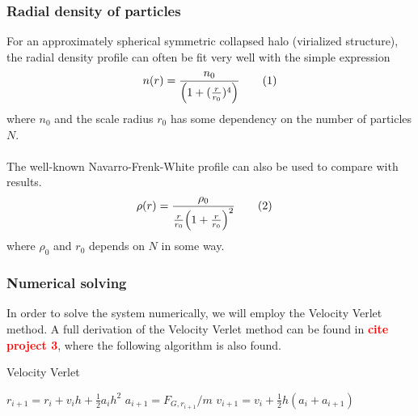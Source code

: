 \documentclass{article}
\newcommand\red[1]{\textcolor{red}{\textbf{#1}}}
\newcommand\numberthis{\addtocounter{equation}{1}\tag{\theequation}}
\begin{document}
\subsubsection{Radial density of particles}
For an approximately spherical symmetric collapsed halo (virialized structure), the radial density profile can often be fit very well with the simple expression
\begin{align*}
  n(r) = \frac{n_0}{\Big(1+(\frac{r}{r_0})^4\Big)} \numberthis\label{eq:radial_dist}
\end{align*}
where $n_0$ and the scale radius $r_0$ has some dependency on the number of particles $N$.\\\\
The well-known Navarro-Frenk-White profile can also be used to compare with results.
\begin{align*}
  \rho(r) &= \frac{\rho_0}{\frac{r}{r_0}\Big(1+\frac{r}{r_0}\Big)^2}\numberthis\label{eq:NFW}
\end{align*}
where $\rho_0$ and $r_0$ depends on $N$ in some way.
\subsubsection{Numerical solving}
In order to solve the system numerically, we will employ the Velocity Verlet method. A full derivation of the Velocity Verlet method can be found in \red{cite project 3}, where the following algorithm is also found.
\begin{algorithm}[H]
\small
\caption{Velocity Verlet}\label{alg:VelVerlet}
\begin{algorithmic}[1]
\State $r_{i+1} = r_i + v_i h + \frac{1}{2} a_i h^2$
\State $a_{i+1} = F_{G, r_{i+1}}/m$
\State $v_{i+1} = v_i + \frac{1}{2} h (a_i + a_{i+1})$
\EndFor
\end{algorithmic}
\end{algorithm}
\end{document}
